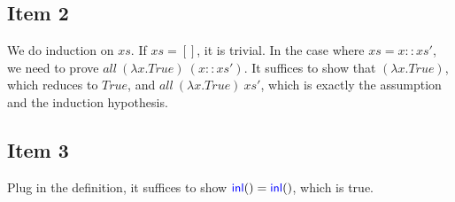 \documentclass{article}
\begin{document}
\subsection*{Item 2}

We do induction on $xs$. If $xs = []$, it is trivial.
In the case where $xs = x :: xs'$, we need to prove $all \ (\lambda x. True) \ (x :: xs')$.
It suffices to show that $(\lambda x. True)$, which reduces to $True$, and $all \ (\lambda x. True) \ xs'$,
which is exactly the assumption and the induction hypothesis.

\subsection*{Item 3}

Plug in the definition, it suffices to show $\textsf{\color{blue} inl}() = \textsf{\color{blue} inl}()$, which is true.
\end{document}
